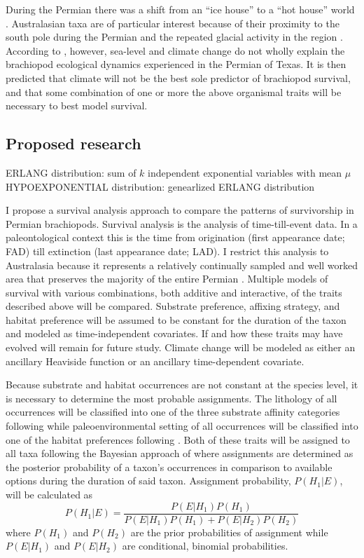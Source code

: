\documentclass[12pt,letterpaper]{article}
\begin{document}
During the Permian there was a shift from an ``ice house'' to a ``hot house'' world \citep{Fielding2006,Birgenheier2010,Jones2006,Powell2007}. Australasian taxa are of particular interest because of their proximity to the south pole during the Permian and the repeated glacial activity in the region \citep{Fielding2006,Birgenheier2010,Jones2006}. According to \citet{Olszewski2004}, however, sea-level and climate change do not wholly explain the brachiopod ecological dynamics experienced in the Permian of Texas. It is then predicted that climate will not be the best sole predictor of brachiopod survival, and that some combination of one or more the above organismal traits will be necessary to best model survival. 


\subsection{Proposed research}
ERLANG distribution: sum of \(k\) independent exponential variables with mean \(\mu\)
HYPOEXPONENTIAL distribution: genearlized ERLANG distribution

I propose a survival analysis approach to compare the patterns of survivorship in Permian brachiopods. Survival analysis is the analysis of time-till-event data. In a paleontological context this is the time from origination (first appearance date; FAD) till extinction (last appearance date; LAD). I restrict this analysis to Australasia because it represents a relatively continually sampled and well worked area that preserves the majority of the entire Permian \citep{Clapham2012,Clapham2008a,Waterhouse1987,Archbold1995}. Multiple models of survival with various combinations, both additive and interactive, of the traits described above will be compared. Substrate preference, affixing strategy, and habitat preference will be assumed to be constant for the duration of the taxon and modeled as time-independent covariates. If and how these traits may have evolved will remain for future study. Climate change will be modeled as either an ancillary Heaviside function or an ancillary time-dependent covariate.

Because substrate and habitat occurrences are not constant at the species level, it is necessary to determine the most probable assignments. The lithology of all occurrences will be classified into one of the three substrate affinity categories following \citet{Foote2006} while paleoenvironmental setting of all occurrences will be classified into one of the habitat preferences following \citet{Kiessling2007}. Both of these traits will be assigned to all taxa following the Bayesian approach of \citet{Simpson2009} where assignments are determined as the posterior probability of a taxon's occurrences in comparison to available options during the duration of said taxon. Assignment probability, \(P(H_{1}|E)\), will be calculated as
\begin{equation}
  P(H_{1}|E) = \frac{P(E|H_{1})P(H_{1})}{P(E|H_{1})P(H_{1}) + P(E|H_{2})P(H_{2})}
  \label{eq:aff}
\end{equation}
where \(P(H_{1})\) and \(P(H_{2})\) are the prior probabilities of assignment while \(P(E|H_{1})\) and \(P(E|H_{2})\) are conditional, binomial probabilities. 
\end{document}
